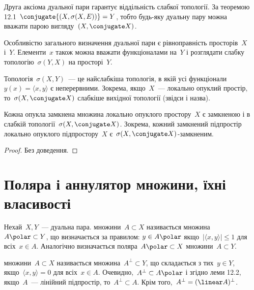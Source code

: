 \begin{remark}
    Друга аксіома дуальної пари гарантує віддільність слабкої топології. За теоремою 12.1~$\conjugate{(X, \sigma(X, E))} = Y$, тобто будь-яку дуальну пару можна вважати парою вигляду~$(X, \conjugate X)$.
\end{remark}

\begin{remark}
    Особливістю загального визначення дуальної пари є рівноправність просторів~$X$ і~$Y$. Елементи~$x$ також можна вважати функціоналами на~$Y$ і розглядати слабку топологію~$\sigma(Y, X)$ на просторі~$Y$.
\end{remark}

\begin{remark}
    Топологія~$\sigma(X, Y)$~--- це найслабкіша топологія, в якій усі функціонали~$y(x) = \langle x, y \rangle$ є неперервними. Зокрема, якщо~$X$~--- локально опуклий простір, то~$\sigma(X, \conjugate X)$ слабкіше вихідної топології (звідси і назва).
\end{remark}

\begin{theorem}
    Кожна опукла замкнена множина локально опуклого простору~$X$ є замкненою і в слабкій топології~$\sigma(X, \conjugate X)$. Зокрема, кожний замкнений підпростір локально опуклого підпростору~$X$ є~$\sigma(X, \conjugate X)$-замкненим.
\end{theorem}

\begin{proof}
    Без доведення.
\end{proof}

\section{Поляра і аннулятор множини, їхні власивості}

\begin{definition}
    Нехай~$X, Y$~--- дуальна пара.  множини~$A \subset X$ називається множина~$A\polar \subset Y$, що визначається за правилом: $y \in A\polar$ якщо~$|\langle x, y \rangle| \le 1$ для всіх~$x \in A$. Аналогічно визначається поляра~$A\polar \subset X$ множини~$A \subset Y$.
\end{definition}

\begin{definition}
     множини~$A \subset X$ називається множина~$A^\perp \subset Y$, що складається з тих~$y \in Y$, якщо~$\langle x, y \rangle = 0$ для всіх~$x \in A$. Очевидно,~$A^\perp \subset A\polar$ і згідно леми 12.2, якщо~$A$~--- лінійний підпростір, то~$A^\perp \subset A$. Крім того,~$A^\perp = (\linear A)^\perp$.
\end{definition}

